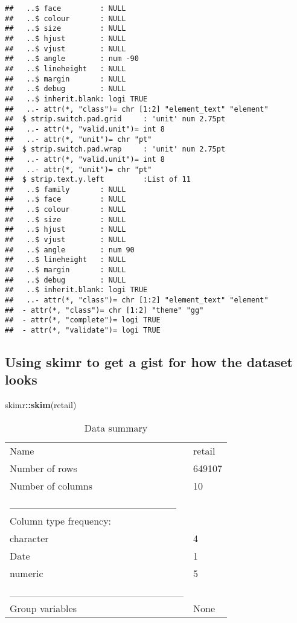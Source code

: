\documentclass[]{article}
\newenvironment{Shaded}{\begin{snugshade}}{\end{snugshade}}
\newcommand{\KeywordTok}[1]{\textcolor[rgb]{0.13,0.29,0.53}{\textbf{#1}}}
\newcommand{\NormalTok}[1]{#1}
\newcommand{\OperatorTok}[1]{\textcolor[rgb]{0.81,0.36,0.00}{\textbf{#1}}}
\begin{document}
\begin{verbatim}
##   ..$ face         : NULL
##   ..$ colour       : NULL
##   ..$ size         : NULL
##   ..$ hjust        : NULL
##   ..$ vjust        : NULL
##   ..$ angle        : num -90
##   ..$ lineheight   : NULL
##   ..$ margin       : NULL
##   ..$ debug        : NULL
##   ..$ inherit.blank: logi TRUE
##   ..- attr(*, "class")= chr [1:2] "element_text" "element"
##  $ strip.switch.pad.grid     : 'unit' num 2.75pt
##   ..- attr(*, "valid.unit")= int 8
##   ..- attr(*, "unit")= chr "pt"
##  $ strip.switch.pad.wrap     : 'unit' num 2.75pt
##   ..- attr(*, "valid.unit")= int 8
##   ..- attr(*, "unit")= chr "pt"
##  $ strip.text.y.left         :List of 11
##   ..$ family       : NULL
##   ..$ face         : NULL
##   ..$ colour       : NULL
##   ..$ size         : NULL
##   ..$ hjust        : NULL
##   ..$ vjust        : NULL
##   ..$ angle        : num 90
##   ..$ lineheight   : NULL
##   ..$ margin       : NULL
##   ..$ debug        : NULL
##   ..$ inherit.blank: logi TRUE
##   ..- attr(*, "class")= chr [1:2] "element_text" "element"
##  - attr(*, "class")= chr [1:2] "theme" "gg"
##  - attr(*, "complete")= logi TRUE
##  - attr(*, "validate")= logi TRUE
\end{verbatim}

\hypertarget{using-skimr-to-get-a-gist-for-how-the-dataset-looks}{%
\subsection{Using skimr to get a gist for how the dataset
looks}\label{using-skimr-to-get-a-gist-for-how-the-dataset-looks}}

\begin{Shaded}
\begin{Highlighting}[]
\NormalTok{skimr}\OperatorTok{::}\KeywordTok{skim}\NormalTok{(retail)}
\end{Highlighting}
\end{Shaded}

\begin{longtable}[]{@{}ll@{}}
\caption{Data summary}\tabularnewline
\toprule
\endhead
Name & retail\tabularnewline
Number of rows & 649107\tabularnewline
Number of columns & 10\tabularnewline
\_\_\_\_\_\_\_\_\_\_\_\_\_\_\_\_\_\_\_\_\_\_\_ &\tabularnewline
Column type frequency: &\tabularnewline
character & 4\tabularnewline
Date & 1\tabularnewline
numeric & 5\tabularnewline
\_\_\_\_\_\_\_\_\_\_\_\_\_\_\_\_\_\_\_\_\_\_\_\_ &\tabularnewline
Group variables & None\tabularnewline
\bottomrule
\end{longtable}
\end{document}
